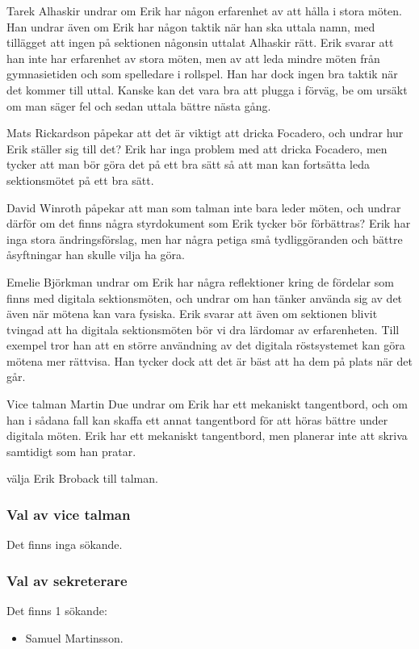 \documentclass[hidelinks]{sektionsmote}
\begin{document}
Tarek Alhaskir undrar om Erik har någon erfarenhet av att hålla i stora möten.
Han undrar även om Erik har någon taktik när han ska uttala namn, med tillägget att ingen på sektionen någonsin uttalat Alhaskir rätt.
Erik svarar att han inte har erfarenhet av stora möten, men av att leda mindre möten från gymnasietiden och som spelledare i rollspel.
Han har dock ingen bra taktik när det kommer till uttal.
Kanske kan det vara bra att plugga i förväg, be om ursäkt om man säger fel och sedan uttala bättre nästa gång.

Mats Rickardson påpekar att det är viktigt att dricka Focadero, och undrar hur Erik ställer sig till det?
Erik har inga problem med att dricka Focadero, men tycker att man bör göra det på ett bra sätt så att man kan fortsätta leda sektionsmötet på ett bra sätt.

David Winroth påpekar att man som talman inte bara leder möten, och undrar därför om det finns några styrdokument som Erik tycker bör förbättras?
Erik har inga stora ändringsförslag, men har några petiga små tydliggöranden och bättre åsyftningar han skulle vilja ha göra.

Emelie Björkman undrar om Erik har några reflektioner kring de fördelar som finns med digitala sektionsmöten, och undrar om han tänker använda sig av det även när mötena kan vara fysiska.
Erik svarar att även om sektionen blivit tvingad att ha digitala sektionsmöten bör vi dra lärdomar av erfarenheten.
Till exempel tror han att en större användning av det digitala röstsystemet kan göra mötena mer rättvisa.
Han tycker dock att det är bäst att ha dem på plats när det går.

Vice talman Martin Due undrar om Erik har ett mekaniskt tangentbord, och om han i sådana fall kan skaffa ett annat tangentbord för att höras bättre under digitala möten.
Erik har ett mekaniskt tangentbord, men planerar inte att skriva samtidigt som han pratar.

\begin{beslut}
  \item välja Erik Broback till talman.
\end{beslut}

\subsubsection{Val av vice talman}
Det finns inga sökande.

\subsubsection{Val av sekreterare}
Det finns 1 sökande:
\begin{itemize}
    \item Samuel Martinsson.
\end{itemize}
\end{document}
